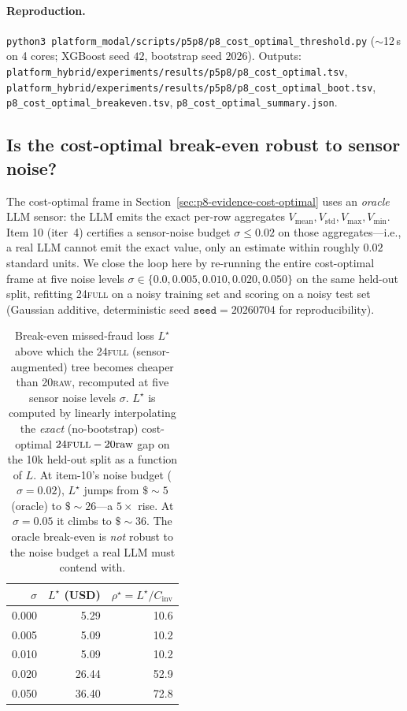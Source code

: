 \documentclass{article}
\providecommand{\secref}[1]{Section~\ref{#1}}
\begin{document}
\paragraph{Reproduction.}
\texttt{python3 platform\_modal/scripts/p5p8/p8\_cost\_optimal\_threshold.py} ($\sim$12\,s on 4 cores; XGBoost
seed $42$, bootstrap seed $2026$). Outputs:
\texttt{platform\_hybrid/experiments/results/p5p8/p8\_cost\_optimal.tsv},
\texttt{platform\_hybrid/experiments/results/p5p8/p8\_cost\_optimal\_boot.tsv},
\texttt{p8\_cost\_optimal\_breakeven.tsv}, \texttt{p8\_cost\_optimal\_summary.json}.
 \subsection{Is the cost-optimal break-even robust to sensor noise?}
\label{sec:p8-evidence-noisy-sensor}

The cost-optimal frame in \secref{sec:p8-evidence-cost-optimal} uses an
\emph{oracle} LLM sensor: the LLM emits the exact per-row aggregates
$V_\text{mean}, V_\text{std}, V_\text{max}, V_\text{min}$. Item 10
(iter~4) certifies a sensor-noise budget $\sigma \le 0.02$ on those
aggregates---i.e., a real LLM cannot emit the exact value, only an
estimate within roughly $0.02$ standard units. We close the loop here by
re-running the entire cost-optimal frame at five noise levels
$\sigma \in \{0.0, 0.005, 0.010, 0.020, 0.050\}$ on the same held-out
split, refitting \textsc{24full} on a noisy training set and scoring on
a noisy test set (Gaussian additive, deterministic seed
$\texttt{seed}=20260704$ for reproducibility).

\begin{table}[t]
\centering
\small
\caption{Break-even missed-fraud loss $L^\star$ above which the
\textsc{24full} (sensor-augmented) tree becomes cheaper than
\textsc{20raw}, recomputed at five sensor noise levels
$\sigma$. $L^\star$ is computed by linearly interpolating the
\emph{exact} (no-bootstrap) cost-optimal $24\textsc{full}-20\text{raw}$
gap on the 10k held-out split as a function of $L$. At item-10's noise
budget ($\sigma{=}0.02$), $L^\star$ jumps from
$\$\sim5$ (oracle) to $\$\sim 26$---a $5\times$ rise. At
$\sigma{=}0.05$ it climbs to $\$\sim 36$. The oracle break-even is
\emph{not} robust to the noise budget a real LLM must contend with.}
\label{tab:p8-noisy-be}
\begin{tabular}{r r r}
\toprule
$\sigma$ & $L^\star$ (USD) & $\rho^\star = L^\star / C_\text{inv}$ \\
\midrule
0.000 &  5.29 & 10.6 \\
0.005 &  5.09 & 10.2 \\
0.010 &  5.09 & 10.2 \\
0.020 & 26.44 & 52.9 \\
0.050 & 36.40 & 72.8 \\
\bottomrule
\end{tabular}
\end{table}
\end{document}
